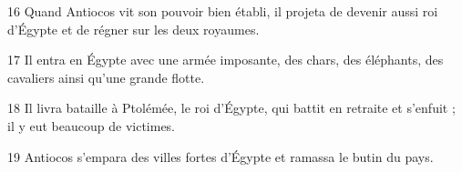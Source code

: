 16 Quand Antiocos vit son pouvoir bien établi, il projeta de devenir aussi roi d’Égypte et de régner sur les deux royaumes.

17 Il entra en Égypte avec une armée imposante, des chars, des éléphants, des cavaliers ainsi qu’une grande flotte.

18 Il livra bataille à Ptolémée, le roi d’Égypte, qui battit en retraite et s’enfuit ; il y eut beaucoup de victimes.

19 Antiocos s’empara des villes fortes d’Égypte et ramassa le butin du pays.
